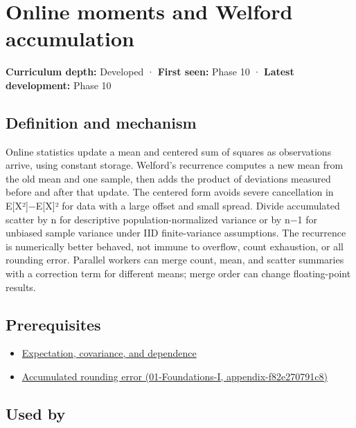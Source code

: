 \hypertarget{appendix-33237f0f618b}{}
\section{Online moments and Welford accumulation}\label{appendix-33237f0f618b-online-moments-and-welford-accumulation}

\textbf{Curriculum depth:} Developed · \textbf{First seen:} Phase 10 · \textbf{Latest development:} Phase 10

\subsection{Definition and mechanism}\label{appendix-33237f0f618b-definition-and-mechanism}

Online statistics update a mean and centered sum of squares as observations arrive, using constant storage. Welford's recurrence computes a new mean from the old mean and one sample, then adds the product of deviations measured before and after that update. The centered form avoids severe cancellation in E{[}X²{]}−E{[}X{]}² for data with a large offset and small spread. Divide accumulated scatter by n for descriptive population-normalized variance or by n−1 for unbiased sample variance under IID finite-variance assumptions. The recurrence is numerically better behaved, not immune to overflow, count exhaustion, or all rounding error. Parallel workers can merge count, mean, and scatter summaries with a correction term for different means; merge order can change floating-point results.

\subsection{Prerequisites}\label{appendix-33237f0f618b-prerequisites}

\begin{itemize}
\tightlist
\item
  \hyperref[appendix-54c383df9992]{Expectation, covariance, and dependence}
\item
  \href{../01-Foundations-I/main.pdf\#nameddest=appendix-f82e270791c8}{Accumulated rounding error (01-Foundations-I, appendix-f82e270791c8)}
\end{itemize}

\subsection{Used by}\label{appendix-33237f0f618b-used-by}

